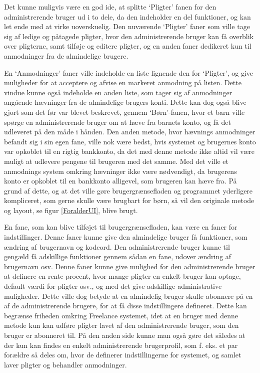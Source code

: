 Det kunne muligvis være en god ide, at splitte ‘Pligter’ fanen for den administrerende bruger ud i to dele, da den indeholder en del funktioner, og kan let ende med at virke uoverskuelig. Den nuværende ‘Pligter’ faner som ville tage sig af ledige og påtagede pligter, hvor den administrerende bruger kan få overblik over pligterne, samt tilføje og editere pligter, og en anden faner dedikeret kun til anmodninger fra de almindelige brugere.

En ‘Anmodninger’ faner ville indeholde en liste lignende den for ‘Pligter’, og give muligheder for at acceptere og afvise en markeret anmodning på listen. Dette vindue kunne også indeholde en anden liste, som tager sig af anmodninger angående hævninger fra de almindelige brugers konti. Dette kan dog også blive gjort som det før var blevet beskrevet, gennem ‘Børn’-fanen, hvor et barn ville spørge en administrerende bruger om at hæve fra barnets konto, og få det udleveret på den måde i hånden. Den anden metode, hvor hævnings anmodninger befandt sig i sin egen fane, ville nok være bedst, hvis systemet og brugernes konto var opkoblet til en rigtig bankkonto, da det med denne metode ikke altid vil være muligt at udlevere pengene til brugeren med det samme. Med det ville et anmodnings system omkring hævninger ikke være nødvendigt, da brugerens konto er opkoblet til en bankkonto alligevel, som brugeren kan hæve fra. På grund af dette, og at det ville gøre brugergrænsefladen og programmet yderligere kompliceret, som gerne skulle være brugbart for børn, så vil den originale metode og layout, se figur \ref{ForalderUI}, blive brugt.

En fane, som kan blive tilføjet til brugergrænsefladen, kan være en faner for indstillinger. Denne faner kunne give den almindelige bruger få funktioner, som ændring af brugernavn og kodeord. Den administrerende bruger kunne til gengæld få adskillige funktioner gennem sådan en fane, udover ændring af brugernavn osv. Denne faner kunne give mulighed for den administrerende bruger at definere en rente procent, hvor mange pligter en enkelt bruger kan optage, default værdi for pligter osv., og med det give adskillige administrative muligheder. Dette ville dog betyde at en almindelig bruger skulle abonnere på en af de administrerende brugere, for at få disse indstillingere defineret. Dette kan begrænse friheden omkring Freelance systemet, idet at en bruger med denne metode kun kan udføre pligter lavet af den administrerende bruger, som den bruger er abonneret til. På den anden side kunne man også gøre det således at der kun kan findes en enkelt administrerende brugerprofil, som f. eks. et par forældre så deles om, hvor de definerer indstillingerne for systemet, og samlet laver pligter og behandler anmodninger.
